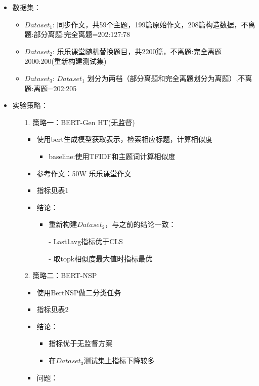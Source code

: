 \documentclass[11pt]{article}
\begin{document}
\begin{CJK}{UTF8}{gkai}
\begin{itemize}
  \item 数据集：
  \begin{itemize}
    \item $Dataset_1$: 同步作文，共59个主题，199篇原始作文，208篇构造数据，不离题:部分离题:完全离题=202:127:78
    \item $Dataset_2$: 乐乐课堂随机替换题目，共2200篇，不离题:完全离题2000:200(重新构建测试集)
    \item $Dataset_3$: $Dataset_1$ 划分为两档（部分离题和完全离题划分为离题）,不离题:离题=202:205
  \end{itemize}
  \item 实验策略：
  \begin{itemize}
    \item [1.] 策略一：BERT-Gen HT(无监督)
    \begin{itemize}
      \item 使用bert生成模型获取表示，检索相应标题，计算相似度
      \begin{itemize}
        \item baseline:使用TFIDF和主题词计算相似度
      \end{itemize}
    \end{itemize} 
    \begin{itemize}
      \item 参考作文：50W 乐乐课堂作文
      \item 指标见表1
      \item 结论：
      \begin{itemize}
        \item 重新构建$Dataset_2$，与之前的结论一致：
        \item [-] Last1avg指标优于CLS
        \item [-] 取topk相似度最大值时指标最优
      \end{itemize}
    \end{itemize}
    \item [2.] 策略二：BERT-NSP
    \begin{itemize}
      \item 使用BertNSP做二分类任务
      \item 指标见表2
      \item 结论：
      \begin{itemize}
        \item 指标优于无监督方案
        \item 在$Dataset_3$测试集上指标下降较多
      \end{itemize}
      \item 问题：

\end{itemize}
\end{itemize}
\end{itemize}
\end{CJK}
\end{document}
